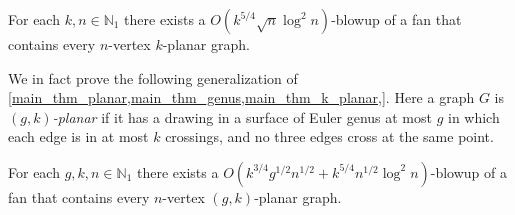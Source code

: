 \documentclass{patmorin}
\renewcommand{\geq}{\geqslant}
\newcommand{\defin}[1]{\emph{\textcolor{brightmaroon}{#1}}}
\newcommand{\NN}{\mathbb{N}}
\begin{document}
\begin{thm}\label{main_thm_k_planar}
    For each $k,n\in\NN_1$ there exists a $O(k^{5/4}\sqrt{n}\log^2n)$-blowup of a fan that contains every $n$-vertex $k$-planar graph.
\end{thm}

We in fact prove the following generalization of \cref{main_thm_planar,main_thm_genus,main_thm_k_planar,}. Here a graph $G$ is \defin{$(g,k)$-planar} if it has a drawing in a surface of Euler genus at most $g$ in which each edge is in at most $k$ crossings, and no three edges cross at the same point. 

\begin{thm}
\label{main_thm_gk_planar}
    For each $g,k,n\in\NN_1$ there exists a 
    $O( k^{3/4}g^{1/2}n^{1/2} + k^{5/4}n^{1/2}\log^2 n)$-blowup of a fan that contains every $n$-vertex $(g,k)$-planar graph.
\end{thm}





\end{document}
